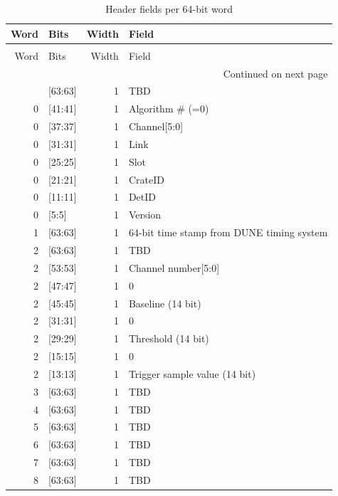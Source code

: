 \begin{longtable}{rlrl}
\caption{Header fields per 64-bit word}
\label{tab:header-fields}\\
\toprule
 Word &    Bits &  Width &                                     Field \\
\midrule
\endfirsthead
\caption[]{Header fields per 64-bit word} \\
\toprule
 Word &    Bits &  Width &                                     Field \\
\midrule
\endhead
\midrule
\multicolumn{4}{r}{{Continued on next page}} \\
\midrule
\endfoot

\bottomrule
\endlastfoot
    0 & [63:63] &      1 &                                       TBD \\
    0 & [41:41] &      1 &                          Algorithm \# (=0) \\
    0 & [37:37] &      1 &                              Channel[5:0] \\
    0 & [31:31] &      1 &                                      Link \\
    0 & [25:25] &      1 &                                      Slot \\
    0 & [21:21] &      1 &                                   CrateID \\
    0 & [11:11] &      1 &                                     DetID \\
    0 &   [5:5] &      1 &                                   Version \\
    1 & [63:63] &      1 & 64-bit time stamp from DUNE timing system \\
    2 & [63:63] &      1 &                                       TBD \\
    2 & [53:53] &      1 &                       Channel number[5:0] \\
    2 & [47:47] &      1 &                                         0 \\
    2 & [45:45] &      1 &                         Baseline (14 bit) \\
    2 & [31:31] &      1 &                                         0 \\
    2 & [29:29] &      1 &                        Threshold (14 bit) \\
    2 & [15:15] &      1 &                                         0 \\
    2 & [13:13] &      1 &             Trigger sample value (14 bit) \\
    3 & [63:63] &      1 &                                       TBD \\
    4 & [63:63] &      1 &                                       TBD \\
    5 & [63:63] &      1 &                                       TBD \\
    6 & [63:63] &      1 &                                       TBD \\
    7 & [63:63] &      1 &                                       TBD \\
    8 & [63:63] &      1 &                                       TBD \\
\end{longtable}
